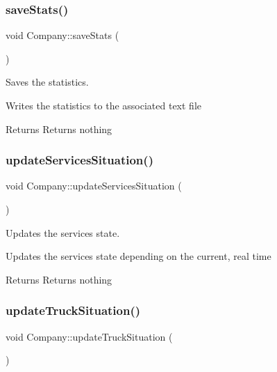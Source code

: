 \subsubsection{\texorpdfstring{save\+Stats()}{saveStats()}}
{\footnotesize\ttfamily void Company\+::save\+Stats (\begin{DoxyParamCaption}{ }\end{DoxyParamCaption})}



Saves the statistics. 

Writes the statistics to the associated text file

\begin{DoxyReturn}{Returns}
Returns nothing 
\end{DoxyReturn}
\mbox{\label{class_company_ae5ce2e4c8d26951b71ca73c7589f6875}} 
\subsubsection{\texorpdfstring{update\+Services\+Situation()}{updateServicesSituation()}}
{\footnotesize\ttfamily void Company\+::update\+Services\+Situation (\begin{DoxyParamCaption}{ }\end{DoxyParamCaption})}



Updates the services\textquotesingle{} state. 

Updates the services\textquotesingle{} state depending on the current, real time

\begin{DoxyReturn}{Returns}
Returns nothing 
\end{DoxyReturn}
\mbox{\label{class_company_af058ee612ca75f1bbd6507e078e5de0a}} 
\subsubsection{\texorpdfstring{update\+Truck\+Situation()}{updateTruckSituation()}}
{\footnotesize\ttfamily void Company\+::update\+Truck\+Situation (\begin{DoxyParamCaption}{ }\end{DoxyParamCaption})}



